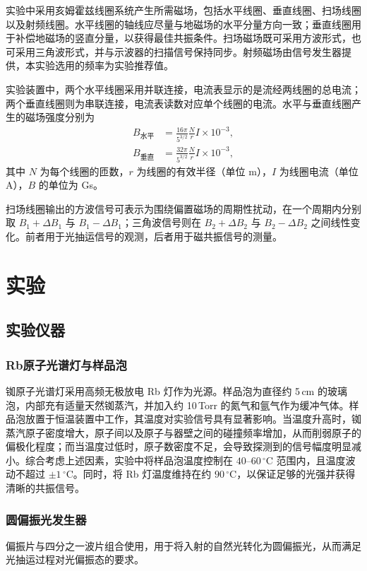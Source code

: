 \documentclass[a4paper, 1.5lines]{ctexart}
\begin{document}
实验中采用亥姆霍兹线圈系统产生所需磁场，包括水平线圈、垂直线圈、扫场线圈以及射频线圈。水平线圈的轴线应尽量与地磁场的水平分量方向一致；垂直线圈用于补偿地磁场的竖直分量，以获得最佳共振条件。扫场磁场既可采用方波形式，也可采用三角波形式，并与示波器的扫描信号保持同步。射频磁场由信号发生器提供，本实验选用的频率为实验推荐值。

实验装置中，两个水平线圈采用并联连接，电流表显示的是流经两线圈的总电流；两个垂直线圈则为串联连接，电流表读数对应单个线圈的电流。水平与垂直线圈产生的磁场强度分别为
\begin{align}
    B_{\text{水平}} &= \frac{16\pi}{5^{3/2}}\frac{N}{r} I \times 10^{-3} , \label{hor}\\
    B_{\text{垂直}} &= \frac{32\pi}{5^{3/2}}\frac{N}{r} I \times 10^{-3} , \label{ver}
\end{align}
其中 $N$ 为每个线圈的匝数，$r$ 为线圈的有效半径（单位 m），$I$ 为线圈电流（单位 A），$B$ 的单位为 Gs。

扫场线圈输出的方波信号可表示为围绕偏置磁场的周期性扰动，在一个周期内分别取 $B_1+\Delta B_1$ 与 $B_1-\Delta B_1$；三角波信号则在 $B_2+\Delta B_2$ 与 $B_2-\Delta B_2$ 之间线性变化。前者用于光抽运信号的观测，后者用于磁共振信号的测量。

    \section{实验}
    
        \subsection{实验仪器}
\subsubsection{Rb原子光谱灯与样品泡}
铷原子光谱灯采用高频无极放电 Rb 灯作为光源。样品泡为直径约 5\,cm 的玻璃泡，内部充有适量天然铷蒸汽，并加入约 10\,Torr 的氮气和氩气作为缓冲气体。样品泡放置于恒温装置中工作，其温度对实验信号具有显著影响。当温度升高时，铷蒸汽原子密度增大，原子间以及原子与器壁之间的碰撞频率增加，从而削弱原子的偏极化程度；而当温度过低时，原子数密度不足，会导致探测到的信号幅度明显减小。综合考虑上述因素，实验中将样品泡温度控制在 $40\text{--}60\,^\circ\mathrm{C}$ 范围内，且温度波动不超过 $\pm 1\,^\circ\mathrm{C}$。同时，将 Rb 灯温度维持在约 $90\,^\circ\mathrm{C}$，以保证足够的光强并获得清晰的共振信号。
\subsubsection{圆偏振光发生器}
偏振片与四分之一波片组合使用，用于将入射的自然光转化为圆偏振光，从而满足光抽运过程对光偏振态的要求。
\end{document}
